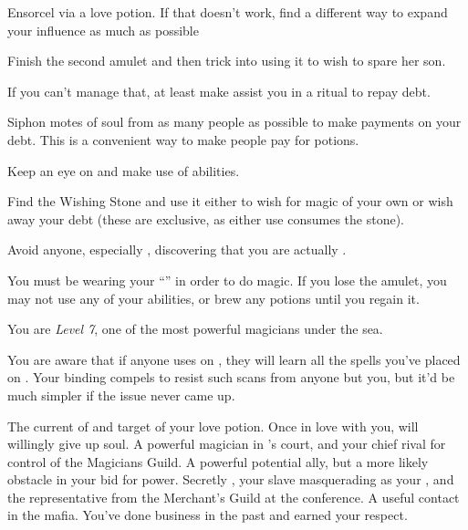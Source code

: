 \documentclass[char]{NeptuneBall}
\begin{document}
\begin{itemz}[Goals]
  \item Ensorcel \cKing{\King} \cKing{} via a love potion. If that doesn't work, find a different way to expand your influence as much as possible
  \item Finish the second amulet and then trick \cAriel{} into using it to wish to spare her son.
  \item If you can't manage that, at least make \cAriel{} assist you in a \gRitual{} ritual to repay \cAriel{\their} debt.
  \item Siphon motes of soul from as many people as possible to make payments on your debt. This is a convenient way to make people pay for potions.
  \item Keep an eye on \cSlave{} and make use of \cSlave{\their} abilities.
	\item Find the Wishing Stone and use it either to wish for magic of your own or wish away your debt (these are exclusive, as either use consumes the stone).
  \item Avoid anyone, especially \cKing{}, discovering that you are actually \cWitch{}.
\end{itemz}

\begin{itemz}[Notes]
  \item You must be wearing your ``\iAmulet{}'' in order to do magic. If you lose the amulet, you may not use any of your abilities, or brew any potions until you regain it.
	\item You are \emph{Level 7}, one of the most powerful magicians under the sea.
	\item You are aware that if anyone uses \aPerceive{} on \cSlave{}, they will learn all the spells you've placed on \cSlave{\them}.  Your binding compels \cSlave{} to resist such scans from anyone but you, but it'd be much simpler if the issue never came up.
\end{itemz}

\begin{contacts}
  \contact{\cKing{}} The current \cKing{\King} of \pAtlantis{} and target of your love potion. Once \cKing{\they} \cKing{\are} in love with you, \cKing{\they} will willingly give up \cKing{\their} soul.
  \contact{\cManta{}} A powerful magician in \cKing{}'s court, and your chief rival for control of the Magicians Guild. A powerful potential ally, but a more likely obstacle in your bid for power.
  \contact{\cSlave{}} Secretly \cSlave{\Prince} \cSlave{}, your slave masquerading as your \cSlave{\sibling}, and the representative from the Merchant's Guild at the conference.
  \contact{\cPriest{}} A useful contact in the mafia. You've done business in the past and \cPriest{\they} \cPriest{\have} earned your respect.
\end{contacts}
\end{document}
